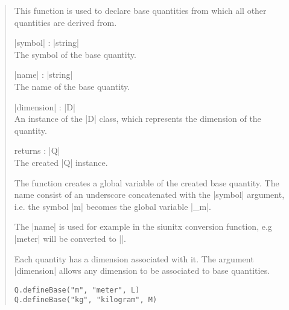 \documentclass{ltxdoc}
\begin{document}
\begin{quote}
  This function is used to declare base quantities from which all other quantities are derived from.

  \begin{description}
  \item |symbol| : |string|\\
    The symbol of the base quantity.

  \item |name| : |string|\\
    The name of the base quantity.

  \item |dimension| : |D|\\
    An instance of the |D| class, which represents the dimension of the quantity.

  \item returns : |Q|\\
    The created |Q| instance.
  \end{description}

  The function creates a global variable of the created base quantity. The name consist of an underscore concatenated with the |symbol| argument, i.e. the symbol |m| becomes the global variable |_m|.

  The |name| is used for example in the siunitx conversion function, e.g |meter| will be converted to |\meter|. 

  Each quantity has a dimension associated with it. The argument |dimension| allows any dimension to be associated to base quantities.

  \subtitle{Example}
  \begin{lstlisting}
Q.defineBase("m", "meter", L)
Q.defineBase("kg", "kilogram", M)
  \end{lstlisting}
\end{quote}
\end{document}
